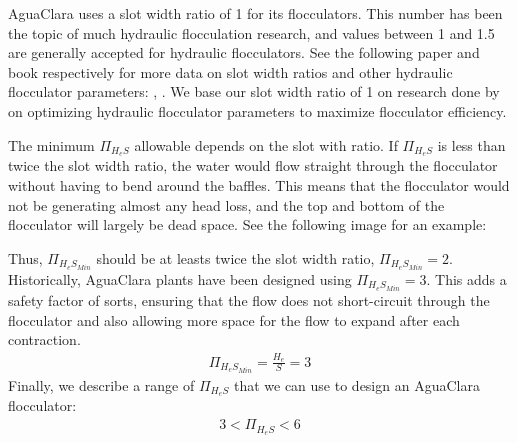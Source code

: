 \documentclass[letterpaper,10pt,english]{sphinxmanual}
\begin{document}
AguaClara uses a slot width ratio of 1 for its flocculators. This number has been the topic of much hydraulic flocculation research, and values between 1 and 1.5 are generally accepted for hydraulic flocculators. See the following paper and book respectively for more data on slot width ratios and other hydraulic flocculator parameters: , . We base our slot width ratio of 1 on research done by  on optimizing hydraulic flocculator parameters to maximize flocculator efficiency.

The minimum \(\Pi_{H_eS}\) allowable depends on the slot with ratio. If \(\Pi_{H_eS}\) is less than twice the slot width ratio, the water would flow straight through the flocculator without having to bend around the baffles. This means that the flocculator would not be generating almost any head loss, and the top and bottom of the flocculator will largely be dead space. See the following image for an example:





Thus, \(\Pi_{H_eS_{Min}}\) should be at leasts twice the slot width ratio, \(\Pi_{H_eS_{Min}} = 2\). Historically, AguaClara plants have been designed using \(\Pi_{H_eS_{Min}} = 3\). This adds a safety factor of sorts, ensuring that the flow does not short-circuit through the flocculator and also allowing more space for the flow to expand after each contraction.
\begin{equation}\label{equation:Flocculation/Floc_Design:Flocculation/Floc_Design:20}
\begin{split}\Pi_{H_eS_{Min}} = \frac{H_e}{S} = 3\end{split}
\end{equation}
Finally, we describe a range of \(\Pi_{H_eS}\) that we can use to design an AguaClara flocculator:
\begin{equation}\label{equation:Flocculation/Floc_Design:Flocculation/Floc_Design:21}
\begin{split}3 < \Pi_{H_eS} < 6\end{split}
\end{equation}
\end{document}
